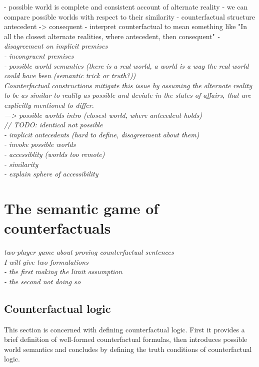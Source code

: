\documentclass[a4paper,american]{paper}
\theoremstyle{definition}\newtheorem{definition}{Definition}
\begin{document}
- possible world is complete and consistent account of alternate reality
- we can compare possible worlds with respect to their similarity
- counterfactual structure antecedent -> consequent
- interpret counterfactual to mean something like "In all the closest alternate realities, where antecedent, then consequent"
\textit{
- disagreement on implicit premises\\
- incongruent premises\\
- possible world semantics (there is a real world, a world is a way the real world could have been (semantic trick or truth?))\\
Counterfactual constructions mitigate this issue by assuming the alternate reality to be as similar to reality as possible and deviate in the states of affairs, that are explicitly mentioned to differ.\\
---> possible worlds intro (closest world, where antecedent holds)\\
// TODO: identical not possible\\
- implicit antecedents (hard to define, disagreement about them)\\
- invoke possible worlds\\
- accessiblity (worlds too remote)\\
- similarity\\
- explain sphere of accessibility
}
\section{The semantic game of counterfactuals}
\textit{two-player game about proving counterfactual sentences\\
I will give two formulations\\
- the first making the limit assumption\\
- the second not doing so}
\subsection{Counterfactual logic}
This section is concerned with defining counterfactual logic. First it provides a brief definition of well-formed counterfactual formulas, then introduces possible world semantics and concludes by defining the truth conditions of counterfactual logic.
\end{document}
